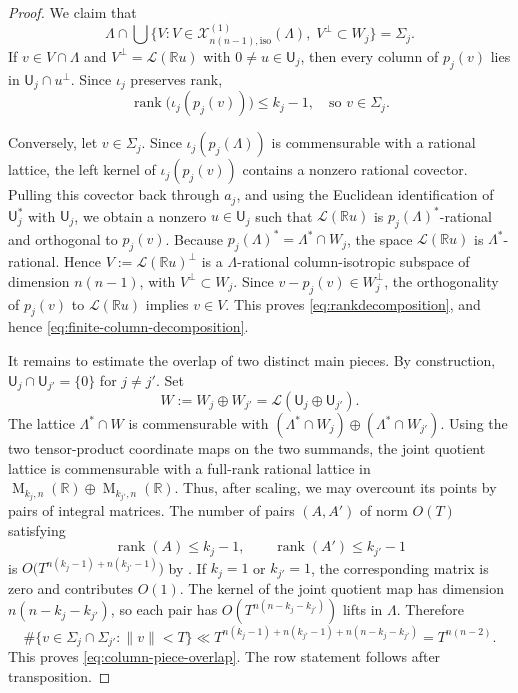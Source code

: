 \documentclass[reqno,11pt]{amsart}
\numberwithin{equation}{section}
\theoremstyle{definition}
\theoremstyle{remark}
\newcommand{\op}{\operatorname}
\newcommand{\rank}{\op{rank}}
\newcommand{\M}{\op{M}}
\begin{document}
\begin{proof}
We claim that
\begin{equation}\label{eq:rankdecomposition}
\Lambda\cap
\bigcup
\{V : {V\in\mathcal X^{(1)}_{n(n-1),\mathrm{iso}}(\Lambda),\; V^\perp\subset W_j}\}
=
\Sigma_j.
\end{equation}
If $v\in V\cap\Lambda$ and $V^\perp=\mathcal L(\mathbb Ru)$ with
$0\ne u\in \mathsf U_j$, then every column of $p_j(v)$ lies in
$\mathsf U_j\cap u^\perp$. Since $\iota_j$ preserves rank,
$$
\rank\bigl(\iota_j(p_j(v))\bigr)\le k_j-1, \quad\text{so $v\in\Sigma_j$.}
$$


Conversely, let $v\in\Sigma_j$. Since $\iota_j(p_j(\Lambda))$ is
commensurable with a rational lattice, the left kernel of
$\iota_j(p_j(v))$ contains a nonzero rational covector. Pulling this covector
back through $a_j$, and using the Euclidean identification of $\mathsf U_j^*$ with
$\mathsf U_j$, we obtain a nonzero $u\in \mathsf U_j$ such that
$\mathcal L(\mathbb Ru)$ is $p_j(\Lambda)^*$-rational and orthogonal to
$p_j(v)$. Because $p_j(\Lambda)^*=\Lambda^*\cap W_j$, the space
$\mathcal L(\mathbb Ru)$ is $\Lambda^*$-rational. Hence $V:=\mathcal L(\mathbb Ru)^\perp$ is a $\Lambda$-rational column-isotropic subspace of dimension $n(n-1)$,
with $V^\perp\subset W_j$. Since $v-p_j(v)\in W_j^\perp$, the
orthogonality of $p_j(v)$ to $\mathcal L(\mathbb Ru)$ implies $v\in V$.
This proves \eqref{eq:rankdecomposition}, and hence
\eqref{eq:finite-column-decomposition}.

It remains to estimate the overlap of two distinct main pieces. By
construction, $\mathsf U_j\cap \mathsf U_{j'}=\{0\}$ for $j\ne j'$. Set
$$
W:=W_j\oplus W_{j'}=\mathcal L(\mathsf U_j\oplus \mathsf U_{j'}).
$$
The lattice $\Lambda^*\cap W$ is commensurable with $(\Lambda^*\cap W_j)\oplus(\Lambda^*\cap W_{j'})$. Using the two tensor-product coordinate maps on the two summands, the joint
quotient lattice is commensurable with a full-rank rational lattice in $\M_{k_j,n}(\mathbb R)\oplus\M_{k_{j'},n}(\mathbb R)$. Thus, after scaling, we may overcount its points by pairs of integral
matrices. The number of pairs $(A,A')$ of norm $O(T)$ satisfying
$$
\rank(A)\le k_j-1,
\qquad
\rank(A')\le k_{j'}-1
$$
is $O\bigl(T^{n(k_j-1)+n(k_{j'}-1)}\bigr)$ by .
If  $k_j=1$ or $k_{j'}=1$, the
corresponding matrix is zero and contributes $O(1)$. The kernel of the joint
quotient map has dimension $n(n-k_j-k_{j'})$, so each pair has
$O(T^{n(n-k_j-k_{j'})})$ lifts in $\Lambda$. Therefore
$$
\#\{v\in\Sigma_j\cap\Sigma_{j'}:\|v\|< T\}
\ll
T^{n(k_j-1)+n(k_{j'}-1)+n(n-k_j-k_{j'})}
=
T^{n(n-2)}.
$$
This proves \eqref{eq:column-piece-overlap}. The row statement follows after
transposition.
\end{proof}
\end{document}

